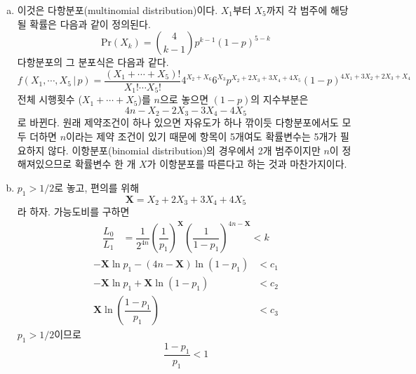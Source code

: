 \documentclass[answers]{exam}
\begin{document}
\begin{questions}
   \begin{solution}
    \begin{enumerate}[(a)]
      \item 이것은 다항분포(multinomial distribution)이다. $X_{1}$부터 $X_{5}$까지 각 범주에 해당될 확률은 다음과 같이 정의된다.
      \begin{equation}
        \mathrm{Pr}\left(X_{k}\right) = {{4}\choose{k-1}}p^{k-1}\left(1-p\right)^{5-k}
      \end{equation}
      다항분포의 그 분포식은 다음과 같다.
      \begin{equation}
        f\left(X_{1},\cdots,X_{5}\,|\,p\right) = \dfrac{\left(X_{1}+\cdots +X_{5}\right)!}{X_{1}!\cdots X_{5}!} 4^{X_{2}+X_{6}}6^{X_{3}}p^{X_{2}+2X_{3}+3X_{4}+4X_{5}}\left(1-p\right)^{4X_{1}+3X_{2}+2X_{3}+X_{4}}
      \end{equation}
      전체 시행횟수 ($X_{1}+\cdots+X_{5}$)를 $n$으로 놓으면 $\left(1-p\right)$의 지수부분은
      \begin{equation}
        4n-X_{2}-2X_{3}-3X_{4}-4X_{5}
      \end{equation}
      로 바뀐다. 원래 제약조건이 하나 있으면 자유도가 하나 깎이듯 다항분포에서도 모두 더하면 $n$이라는 제약 조건이 있기 때문에 항목이 5개여도 확률변수는 5개가 필요하지 않다. 이항분포(binomial distribution)의 경우에서 2개 범주이지만 $n$이 정해져있으므로 확률변수 한 개 $X$가 이항분포를 따른다고 하는 것과 마찬가지이다.
      \item $p_{1}>1/2$로 놓고, 편의를 위해
      \begin{equation}
        \mathbf{X}=X_{2}+2X_{3}+3X_{4}+4X_{5}
      \end{equation}
      라 하자. 가능도비를 구하면
      \begin{align}
        \dfrac{L_{0}}{L_{1}} &= \dfrac{1}{2^{4n}}\left(\dfrac{1}{p_{1}}\right)^{\mathbf{X}}\left(\dfrac{1}{1-p_{1}}\right)^{4n-\mathbf{X}} < k
      \end{align}
      \begin{align}
        -\mathbf{X}\ln p_{1}-\left(4n-\mathbf{X}\right)\ln \left(1-p_{1}\right) &< c_{1}\\
        -\mathbf{X}\ln p_{1}+\mathbf{X}\ln \left(1-p_{1}\right) &< c_{2}\\
        \mathbf{X}\ln\left(\dfrac{1-p_{1}}{p_{1}}\right) &< c_{3}
      \end{align}
      $p_{1}>1/2$이므로
      \begin{equation}
        \dfrac{1-p_{1}}{p_{1}} < 1
      \end{equation}

\end{enumerate}
\end{solution}
\end{questions}
\end{document}
